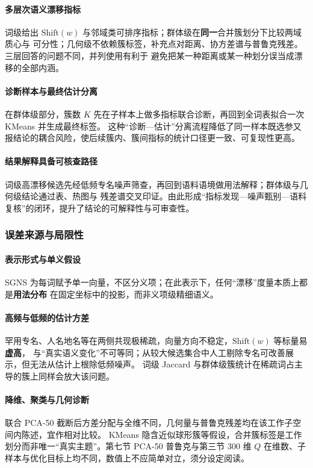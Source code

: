 \documentclass[withoutpreface]{cumcmthesis}
\begin{document}
\paragraph{多层次语义漂移指标} 词级给出 $\mathrm{Shift}(w)$ 与邻域类可排序指标；群体级在\textbf{同一}合并簇划分下比较两域质心与
可分性；几何级不依赖簇标签，补充点对距离、协方差谱与普鲁克残差。三层回答的问题不同，并列使用有利于
避免把某一种距离或某一种划分误当成漂移的全部内涵。

\paragraph{诊断样本与最终估计分离} 在群体级部分，簇数 $K$ 先在子样本上做多指标联合诊断，再回到全词表拟合一次 KMeans 并生成最终标签。
这种“诊断—估计”分离流程降低了同一样本既选参又报结论的耦合风险，使后续簇内、簇间指标的统计口径更一致、可复现性更高。

\paragraph{结果解释具备可核查路径} 词级高漂移候选先经低频专名噪声筛查，再回到语料语境做用法解释；群体级与几何级结论通过表、热图与
残差谱交叉印证。由此形成“指标发现—噪声甄别—语料复核”的闭环，提升了结论的可解释性与可审查性。

\subsubsection{误差来源与局限性}

\paragraph{表示形式与单义假设}
SGNS 为每词赋予单一向量，不区分义项；在此表示下，任何“漂移”度量本质上都是\textbf{用法分布}
在固定坐标中的投影，而非义项级精细语义。

\paragraph{高频与低频的估计方差}
罕用专名、人名地名等在两侧共现极稀疏，向量方向不稳定，$\mathrm{Shift}(w)$ 等标量易\textbf{虚高}，
与“真实语义变化”不可等同；从较大候选集合中人工剔除专名可改善展示，但无法从估计上根除低频噪声。
词级 Jaccard 与群体级簇统计在稀疏词占主导的簇上同样会放大该问题。

\paragraph{降维、聚类与几何诊断}
联合 PCA-50 截断后方差分配与全维不同，几何量与普鲁克残差均在该工作子空间内陈述，宜作相对比较。
KMeans 隐含近似球形簇等假设，合并簇标签是工作划分而非唯一“真实主题”。第七节 PCA-50 普鲁克与第三节
$300$ 维 $Q$ 在维数、子样本与优化目标上均不同，数值上不应简单对立，须分设定阅读。
\end{document}
